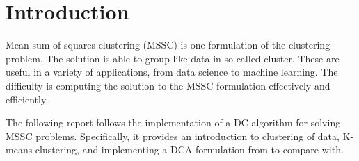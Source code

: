\section{Introduction}
Mean sum of squares clustering  (MSSC) is one formulation of the clustering problem. The solution is able to group like data in so called cluster. These are useful in a variety of applications, from data science to machine learning. The difficulty is computing the solution to the MSSC formulation effectively and efficiently. 

The following report follows the implementation of a DC algorithm for solving MSSC problems. Specifically, it provides an introduction to clustering of data, K-means clustering, and implementing a DCA formulation from \cite{an_minimum_2009} to compare with. 



